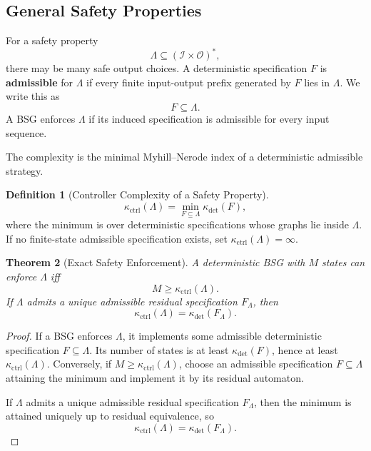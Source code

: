 \documentclass[12pt]{article}
\newtheorem{theorem}{Theorem}[section]
\theoremstyle{definition}
\newtheorem{definition}[theorem]{Definition}
\begin{document}
\subsection{General Safety Properties}
\label{subsec:safety}

For a safety property
\[
\Lambda\subseteq(\mathcal I\times\mathcal O)^*,
\]
there may be many safe output choices.  A deterministic specification $F$ is
\textbf{admissible} for $\Lambda$ if every finite input-output prefix generated
by $F$ lies in $\Lambda$.  We write this as
\[
F\subseteq\Lambda.
\]
A BSG enforces $\Lambda$ if its induced specification is admissible for every
input sequence.

The complexity is the minimal Myhill--Nerode index of a deterministic
admissible strategy.

\begin{definition}[Controller Complexity of a Safety Property]
\label{def:controller-complexity}
\[
\kappa_{\mathrm{ctrl}}(\Lambda)
=
\min_{F\subseteq\Lambda}
\kappa_{\det}(F),
\]
where the minimum is over deterministic specifications whose graphs lie inside
$\Lambda$.  If no finite-state admissible specification exists, set
$\kappa_{\mathrm{ctrl}}(\Lambda)=\infty$.
\end{definition}

\begin{theorem}[Exact Safety Enforcement]
\label{thm:safety-enforce}
A deterministic BSG with $M$ states can enforce $\Lambda$ iff
\[
M\ge\kappa_{\mathrm{ctrl}}(\Lambda).
\]
If $\Lambda$ admits a unique admissible residual specification $F_\Lambda$,
then
\[
\kappa_{\mathrm{ctrl}}(\Lambda)
=
\kappa_{\det}(F_\Lambda).
\]
\end{theorem}

\begin{proof}
If a BSG enforces $\Lambda$, it implements some admissible deterministic
specification $F\subseteq\Lambda$.  Its number of states is at least
$\kappa_{\det}(F)$, hence at least $\kappa_{\mathrm{ctrl}}(\Lambda)$.
Conversely, if $M\ge\kappa_{\mathrm{ctrl}}(\Lambda)$, choose an admissible
specification $F\subseteq\Lambda$ attaining the minimum and implement it by its
residual automaton.

If $\Lambda$ admits a unique admissible residual specification $F_\Lambda$,
then the minimum is attained uniquely up to residual equivalence, so
\[
\kappa_{\mathrm{ctrl}}(\Lambda)
=
\kappa_{\det}(F_\Lambda).
\]
\end{proof}
\end{document}

